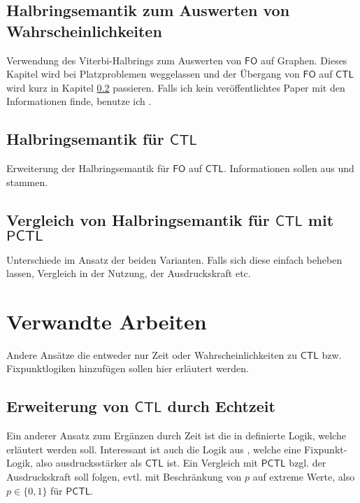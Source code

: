 \documentclass{lni}
\newcommand{\CTL}{\mathsf{CTL}}
\newcommand{\PCTL}{\mathsf{PCTL}}
\begin{document}
\subsection{Halbringsemantik zum Auswerten von Wahrscheinlichkeiten}
\label{HalbringFO}

Verwendung des Viterbi-Halbrings zum Auswerten von $\mathsf{FO}$ auf Graphen. Dieses Kapitel wird bei Platzproblemen weggelassen und der Übergang von $\mathsf{FO}$ auf $\mathsf{CTL}$ wird kurz in Kapitel \ref{HalbringCTL} passieren. Falls ich kein veröffentlichtes Paper mit den Informationen finde, benutze ich \cite{gradel2022provenance}.

\subsection{Halbringsemantik für $\CTL$}
\label{HalbringCTL}

Erweiterung der Halbringsemantik für $\mathsf{FO}$ auf $\CTL$. Informationen sollen aus \cite{dannert2019generalized} und \cite{lluch2005quantitative} stammen.

\subsection{Vergleich von Halbringsemantik für $\CTL$ mit $\PCTL$}

Unterschiede im Ansatz der beiden Varianten. Falls sich diese einfach beheben lassen, Vergleich in der Nutzung, der Ausdruckskraft etc.

\section{Verwandte Arbeiten}
\label{ChapVerwandt}

Andere Ansätze die entweder nur Zeit oder Wahrscheinlichkeiten zu $\CTL$ bzw. Fixpunktlogiken hinzufügen sollen hier erläutert werden.

\subsection{Erweiterung von $\CTL$ durch Echtzeit}

Ein anderer Ansatz zum Ergänzen durch Zeit ist die in \cite{alur1990model} definierte Logik, welche erläutert werden soll. Interessant ist auch die Logik aus \cite{jahanian1986safety}, welche eine Fixpunkt-Logik, also ausdrucksstärker als $\CTL$ ist.
Ein Vergleich mit $\PCTL$ bzgl. der Ausdruckskraft soll folgen, evtl. mit Beschränkung von $p$ auf extreme Werte, also $p\in \{0,1\}$ für $\PCTL$.
\end{document}

